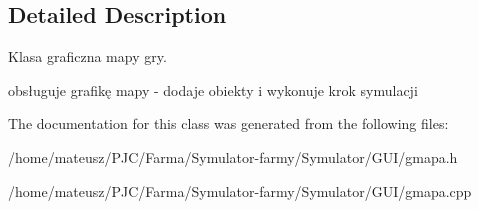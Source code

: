 \subsection{Detailed Description}
Klasa graficzna mapy gry. 

obsługuje grafikę mapy -\/ dodaje obiekty i wykonuje krok symulacji 

The documentation for this class was generated from the following files\+:\begin{DoxyCompactItemize}
\item 
/home/mateusz/\+P\+J\+C/\+Farma/\+Symulator-\/farmy/\+Symulator/\+G\+U\+I/gmapa.\+h\item 
/home/mateusz/\+P\+J\+C/\+Farma/\+Symulator-\/farmy/\+Symulator/\+G\+U\+I/gmapa.\+cpp\end{DoxyCompactItemize}
